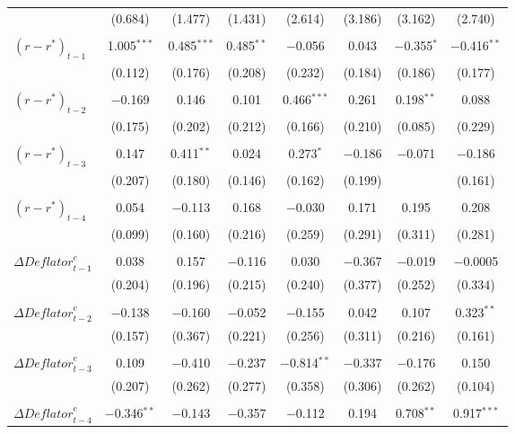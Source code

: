 \documentclass[11pt]{article}
\begin{document}
\begin{table}[!htbp]
\begin{threeparttable}
\begin{tabular}{@{\extracolsep{3pt}}lccccccc}
    & (0.684) & (1.477) & (1.431) & (2.614) & (3.186) & (3.162) & (2.740) \\ 
    & & & & & & & \\ 
    $\left(r-r^*\right)_{t-1}$ & 1.005$^{***}$ & 0.485$^{***}$ & 0.485$^{**}$ & $-$0.056 & 0.043 & $-$0.355$^{*}$ & $-$0.416$^{**}$ \\ 
    & (0.112) & (0.176) & (0.208) & (0.232) & (0.184) & (0.186) & (0.177) \\  
    & & & & & & & \\ 
    $\left(r-r^*\right)_{t-2}$ & $-$0.169 & 0.146 & 0.101 & 0.466$^{***}$ & 0.261 & 0.198$^{**}$ & 0.088 \\ 
    & (0.175) & (0.202) & (0.212) & (0.166) & (0.210) & (0.085) & (0.229) \\ 
    & & & & & & & \\ 
    $\left(r-r^*\right)_{t-3}$ & 0.147 & 0.411$^{**}$ & 0.024 & 0.273$^{*}$ & $-$0.186 & $-$0.071 & $-$0.186 \\ 
    & (0.207) & (0.180) & (0.146) & (0.162) & (0.199) &  & (0.161) \\ 
    & & & & & & & \\ 
    $\left(r-r^*\right)_{t-4}$ & 0.054 & $-$0.113 & 0.168 & $-$0.030 & 0.171 & 0.195 & 0.208 \\ 
    & (0.099) & (0.160) & (0.216) & (0.259) & (0.291) & (0.311) & (0.281) \\ 
    & & & & & & & \\ 
    $\Delta\mathit{Deflator}_{t-1}^e$ & 0.038 & 0.157 & $-$0.116 & 0.030 & $-$0.367 & $-$0.019 & $-$0.0005 \\ 
    & (0.204) & (0.196) & (0.215) & (0.240) & (0.377) & (0.252) & (0.334) \\ 
    & & & & & & & \\ 
    $\Delta\mathit{Deflator}_{t-2}^e$ & $-$0.138 & $-$0.160 & $-$0.052 & $-$0.155 & 0.042 & 0.107 & 0.323$^{**}$ \\ 
    & (0.157) & (0.367) & (0.221) & (0.256) & (0.311) & (0.216) & (0.161) \\ 
    & & & & & & & \\ 
    $\Delta\mathit{Deflator}_{t-3}^e$ & 0.109 & $-$0.410 & $-$0.237 & $-$0.814$^{**}$ & $-$0.337 & $-$0.176 & 0.150 \\ 
    & (0.207) & (0.262) & (0.277) & (0.358) & (0.306) & (0.262) & (0.104) \\ 
    & & & & & & & \\ 
    $\Delta\mathit{Deflator}_{t-4}^e$ & $-$0.346$^{**}$ & $-$0.143 & $-$0.357 & $-$0.112 & 0.194 & 0.708$^{**}$ & 0.917$^{***}$ \\ 

\end{tabular}
\end{threeparttable}
\end{table}
\end{document}
